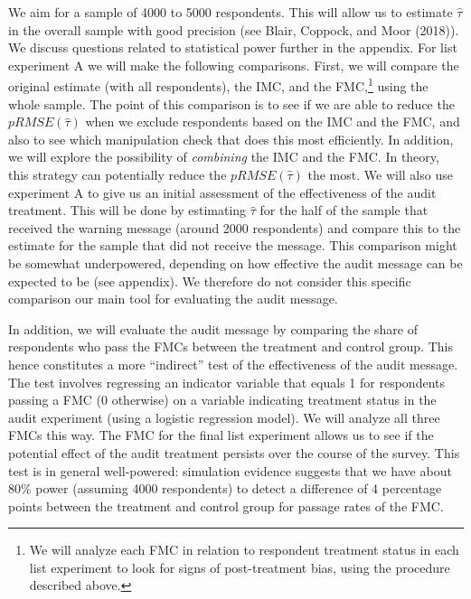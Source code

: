 \documentclass[]{article}
\let\rmarkdownfootnote\footnote%
\def\footnote{\protect\rmarkdownfootnote}
\begin{document}
We aim for a sample of 4000 to 5000 respondents. This will allow us to
estimate \(\hat{\tau}\) in the overall sample with good precision (see
Blair, Coppock, and Moor (2018)). We discuss questions related to
statistical power further in the appendix. For list experiment A we will
make the following comparisons. First, we will compare the original
estimate (with all respondents), the IMC, and the FMC,\footnote{We will
  analyze each FMC in relation to respondent treatment status in each
  list experiment to look for signs of post-treatment bias, using the
  procedure described above.} using the whole sample. The point of this
comparison is to see if we are able to reduce the \(pRMSE(\hat{\tau})\)
when we exclude respondents based on the IMC and the FMC, and also to
see which manipulation check that does this most efficiently. In
addition, we will explore the possibility of \emph{combining} the IMC
and the FMC. In theory, this strategy can potentially reduce the
\(pRMSE(\hat{\tau})\) the most. We will also use experiment A to give us
an initial assessment of the effectiveness of the audit treatment. This
will be done by estimating \(\hat{\tau}\) for the half of the sample
that received the warning message (around 2000 respondents) and compare
this to the estimate for the sample that did not receive the message.
This comparison might be somewhat underpowered, depending on how
effective the audit message can be expected to be (see appendix). We
therefore do not consider this specific comparison our main tool for
evaluating the audit message.

In addition, we will evaluate the audit message by comparing the share
of respondents who pass the FMCs between the treatment and control
group. This hence constitutes a more ``indirect'' test of the
effectiveness of the audit message. The test involves regressing an
indicator variable that equals 1 for respondents passing a FMC (0
otherwise) on a variable indicating treatment status in the audit
experiment (using a logistic regression model). We will analyze all
three FMCs this way. The FMC for the final list experiment allows us to
see if the potential effect of the audit treatment persists over the
course of the survey. This test is in general well-powered: simulation
evidence suggests that we have about 80\% power (assuming 4000
respondents) to detect a difference of 4 percentage points between the
treatment and control group for passage rates of the FMC.
\end{document}
